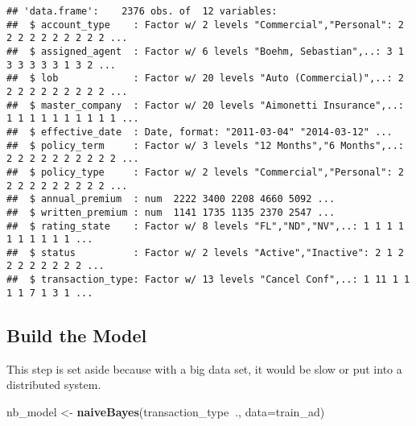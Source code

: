 \documentclass[]{article}
\newenvironment{Shaded}{\begin{snugshade}}{\end{snugshade}}
\newcommand{\CommentTok}[1]{\textcolor[rgb]{0.56,0.35,0.01}{\textit{#1}}}
\newcommand{\DataTypeTok}[1]{\textcolor[rgb]{0.13,0.29,0.53}{#1}}
\newcommand{\FloatTok}[1]{\textcolor[rgb]{0.00,0.00,0.81}{#1}}
\newcommand{\KeywordTok}[1]{\textcolor[rgb]{0.13,0.29,0.53}{\textbf{#1}}}
\newcommand{\NormalTok}[1]{#1}
\newcommand{\OperatorTok}[1]{\textcolor[rgb]{0.81,0.36,0.00}{\textbf{#1}}}
\newcommand{\StringTok}[1]{\textcolor[rgb]{0.31,0.60,0.02}{#1}}
\begin{document}
\begin{verbatim}
## 'data.frame':    2376 obs. of  12 variables:
##  $ account_type    : Factor w/ 2 levels "Commercial","Personal": 2 2 2 2 2 2 2 2 2 2 ...
##  $ assigned_agent  : Factor w/ 6 levels "Boehm, Sebastian",..: 3 1 3 3 3 3 3 1 3 2 ...
##  $ lob             : Factor w/ 20 levels "Auto (Commercial)",..: 2 2 2 2 2 2 2 2 2 2 ...
##  $ master_company  : Factor w/ 20 levels "Aimonetti Insurance",..: 1 1 1 1 1 1 1 1 1 1 ...
##  $ effective_date  : Date, format: "2011-03-04" "2014-03-12" ...
##  $ policy_term     : Factor w/ 3 levels "12 Months","6 Months",..: 2 2 2 2 2 2 2 2 2 2 ...
##  $ policy_type     : Factor w/ 2 levels "Commercial","Personal": 2 2 2 2 2 2 2 2 2 2 ...
##  $ annual_premium  : num  2222 3400 2208 4660 5092 ...
##  $ written_premium : num  1141 1735 1135 2370 2547 ...
##  $ rating_state    : Factor w/ 8 levels "FL","ND","NV",..: 1 1 1 1 1 1 1 1 1 1 ...
##  $ status          : Factor w/ 2 levels "Active","Inactive": 2 1 2 2 2 2 2 2 2 2 ...
##  $ transaction_type: Factor w/ 13 levels "Cancel Conf",..: 1 11 1 1 1 1 7 1 3 1 ...
\end{verbatim}

\begin{Shaded}
\end{Shaded}

\hypertarget{build-the-model}{%
\subsection{Build the Model}\label{build-the-model}}

This step is set aside because with a big data set, it would be slow or
put into a distributed system.

\begin{Shaded}
\begin{Highlighting}[]
\NormalTok{nb_model <-}\StringTok{ }\KeywordTok{naiveBayes}\NormalTok{(transaction_type}\OperatorTok{~}\NormalTok{., }\DataTypeTok{data=}\NormalTok{train_ad)}
\end{Highlighting}
\end{Shaded}
\end{document}

